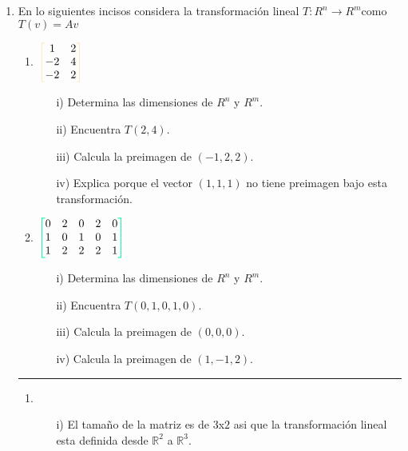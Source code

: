 \documentclass[a4paper,10pt]{article}
\newenvironment{bmatrixcolor}[1][red]
  {\colorlet{savethecolor}{.}\colorlet{bracecolor}{#1}%
    \color{bracecolor}\left[\color{savethecolor}\begin{matrix}}
  {\end{matrix}\color{bracecolor}\right]}
\begin{document}
\begin{enumerate}
      
\item En lo siguientes incisos considera la transformación lineal $T:R^n \rightarrow R^m$como $T(v)=Av$
      \begin{enumerate}
        \item $\begin{bmatrixcolor}[bananamania]
          1 & 2    \\
          -2 & 4   \\
          -2 & 2          
      \end{bmatrixcolor}$\\
              \begin{enumerate}
                \item [i)] Determina las dimensiones de $R^n$ y $R^m$.
                \item [ii)] Encuentra $T(2, 4)$.
                \item [iii)] Calcula la preimagen de $(-1, 2, 2)$.
                \item [iv)] Explica porque el vector $(1, 1, 1)$ no tiene preimagen bajo esta transformación.\\
              \end{enumerate}                           

        \item  $\begin{bmatrixcolor}[mediumspringgreen]
          0 & 2 & 0 & 2 & 0    \\
          1 & 0 & 1 & 0 & 1    \\
          1 & 2 & 2 & 2 & 1            
      \end{bmatrixcolor}$ \\
               \begin{enumerate}
                 \item [i)] Determina las dimensiones de $R^n$ y $R^m$.
                 \item [ii)] Encuentra $T(0, 1, 0, 1, 0)$.
                 \item [iii)] Calcula la preimagen de $(0, 0, 0)$.
                 \item [iv)] Calcula la preimagen de $(1, -1, 2)$.
               \end{enumerate}    
      
      \end{enumerate} 

      {\color{amber} \rule{\linewidth}{0.5mm} }  

      \begin{enumerate}
        \item 
        \begin{enumerate}
          \item [i)] \textcolor{persianrose}{El tamaño de la matriz es de $3$x$2$ asi que la transformación lineal esta definida desde $\mathds{R}^2$ a $\mathds{R}^3$.}\\
          

\end{enumerate}
\end{enumerate}
\end{enumerate}
\end{document}

